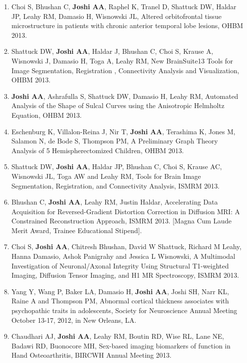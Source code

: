 \documentclass[overlapped,line,letterpaper]{res}
\begin{document}
\begin{resume}
\begin{enumerate}
    \item Choi S, Bhushan C, \textbf{Joshi AA}, Raphel K, Tranel D, Shattuck DW, Haldar JP, Leahy RM, Damasio H, Wisnowski JL, {Altered orbitofrontal tissue microstructure in patients with chronic anterior temporal lobe lesions}, OHBM 2013.

    \item Shattuck DW, \textbf{Joshi AA}, Haldar J, Bhushan C, Choi S, Krause A, Wisnowski J, Damasio H, Toga A, Leahy RM, {New BrainSuite13 Tools for Image Segmentation, Registration , Connectivity Analysis and Visualization}, OHBM 2013.

    \item \textbf{Joshi AA}, Ashrafulla S, Shattuck DW, Damasio H, Leahy RM, {Automated Analysis of the Shape of Sulcal Curves using the Anisotropic Helmholtz Equation}, OHBM 2013.

    \item Eschenburg K, Villalon-Reina J, Nir T, \textbf{Joshi AA}, Terashima K, Jones M, Salamon N, de Bode S, Thompson PM, {A Preliminary Graph Theory Analysis of 5 Hemispherectomized Children}, OHBM 2013.

    \item Shattuck DW, \textbf{Joshi AA}, Haldar JP, Bhushan C, Choi S, Krause AC, Wisnowski JL, Toga AW and Leahy RM, {Tools for Brain Image Segmentation, Registration, and Connectivity Analysis}, ISMRM 2013. 

    \item Bhushan C, \textbf{Joshi AA}, Leahy RM, Justin Haldar, Accelerating Data Acquisition for Reversed-Gradient Distortion Correction in Diffusion MRI: A Constrained Reconstruction Approach, ISMRM 2013. [Magna Cum Laude Merit Award, Trainee Educational Stipend].

    \item Choi S, \textbf{Joshi AA}, Chitresh Bhushan, David W Shattuck, Richard M Leahy, Hanna Damasio, Ashok Panigrahy and Jessica L Wisnowski, A Multimodal Investigation of Neuronal/Axonal Integrity Using Structural T1-weighted Imaging, Diffusion Tensor Imaging, and H1 MR Spectroscopy, ISMRM 2013.

    \item Yang Y, Wang P, Baker LA, Damasio H, \textbf{Joshi AA}, Joshi SH, Narr KL, Raine A and Thompson PM, {Abnormal cortical thickness associates with psychopathic traits in adolescents}, Society for Neuroscience Annual Meeting October 13-17, 2012, in New Orleans, LA.

    \item Chaudhari AJ, \textbf{Joshi AA}, Leahy RM, Boutin RD, Wise RL, Lane NE, Badawi RD, Buonocore MH, {Sex-based imaging biomarkers of function in Hand Osteoarthritis}, BIRCWH Annual Meeting 2013.


\end{enumerate}
\end{resume}
\end{document}
